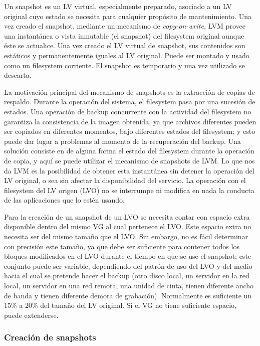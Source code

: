 Un snapshot es un LV virtual, especialmente preparado, asociado a un LV original cuyo estado se necesita  para cualquier propósito de mantenimiento. Una vez creado el snapshot, mediante un mecanismo de \emph{copy-on-write}, LVM provee una instantánea o vista inmutable (el snapshot) del filesystem original aunque éste se actualice. Una vez creado el LV virtual de snapshot, sus contenidos son estáticos y permanentemente iguales al LV original. Puede ser montado y usado como un filesystem corriente. El snapshot es temporario y una vez utilizado se descarta. 

La motivación principal del mecanismo de snapshots es la extracción de copias de respaldo. Durante la operación del sistema, el filesystem pasa por una sucesión de estados. Una operación de backup concurrente con la actividad del filesystem no garantiza la consistencia de la imagen obtenida, ya que  archivos diferentes pueden ser copiados en diferentes momentos, bajo diferentes estados del filesystem; y esto puede dar lugar a problemas al momento de la recuperación del backup. Una solución consiste en  de alguna forma el estado del filesystem durante la operación de copia, y aquí se puede utilizar el mecanismo de snapshots de LVM. Lo que nos da LVM es la posibilidad de obtener esta instantánea sin detener la operación del LV original, o sea sin afectar la disponibilidad del servicio. La operación con el filesystem del LV origen (LVO) no se interrumpe ni modifica en nada la conducta de las aplicaciones que lo estén usando. 

Para la creación de un snapshot de un LVO se necesita contar con espacio extra disponible dentro del mismo VG al cual pertenece el LVO. Este espacio extra no necesita ser del mismo tamaño que el LVO. Sin embargo, no es fácil determinar con precisión este tamaño, ya que debe ser suficiente para contener todos los bloques modificados en el LVO durante el tiempo en que se use el snapshot; este conjunto puede ser variable, dependiendo del patrón de uso del LVO y del medio hacia el cual se pretende hacer el backup (otro disco local, un servidor en la red local, un servidor en una red remota, una unidad de cinta, tienen diferente ancho de banda y tienen diferente demora de grabación).  Normalmente es suficiente un 15\% a 20\% del tamaño del LV original. Si el VG no tiene suficiente espacio, puede extenderse.

\subsubsection{Creación de snapshots}
\label{ssub:snapcreate}

